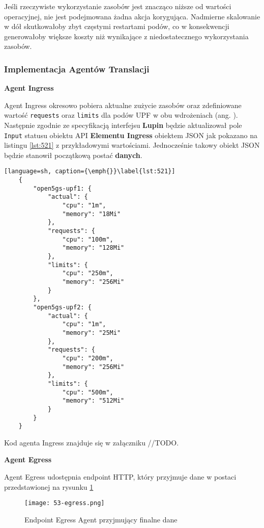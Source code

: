 Jeśli rzeczywiste wykorzystanie zasobów jest znacząco niższe od wartości operacyjnej, nie jest podejmowana żadna akcja korygująca. Nadmierne skalowanie w dół skutkowałoby zbyt częstymi restartami podów, co w konsekwencji generowałoby większe koszty niż wynikające z niedostatecznego wykorzystania zasobów.

\subsubsection{Implementacja Agentów Translacji}

\textbf{Agent Ingress}

Agent Ingress okresowo pobiera aktualne zużycie zasobów oraz zdefiniowane wartość \texttt{requests} oraz \texttt{limits} dla podów UPF w obu wdrożeniach (ang. ). Następnie zgodnie ze specyfikacją interfejsu \textbf{Lupin} będzie aktualizował pole \texttt{Input} statusu obiektu API \textbf{Elementu Ingress} obiektem JSON jak pokazano na listingu \ref{lst:521} z przykładowymi wartościami. Jednocześnie takowy obiekt JSON będzie stanowił początkową postać \textbf{danych}.

\begin{lstlisting}[language=sh, caption={\emph{}}\label{lst:521}]
    {
        "open5gs-upf1: {
            "actual": {
                "cpu": "1m",
                "memory": "18Mi"
            },
            "requests": {
                "cpu": "100m",
                "memory": "128Mi"
            },
            "limits": {
                "cpu": "250m",
                "memory": "256Mi"
            }
        },
        "open5gs-upf2: {
            "actual": {
                "cpu": "1m",
                "memory": "25Mi"
            },
            "requests": {
                "cpu": "200m",
                "memory": "256Mi"
            },
            "limits": {
                "cpu": "500m",
                "memory": "512Mi"
            }
        }
    }
\end{lstlisting}

Kod agenta Ingress znajduje się w załączniku //TODO.

\textbf{Agent Egress}

Agent Egress udostępnia endpoint HTTP, który przyjmuje dane w postaci przedstawionej na rysunku \ref{fig:53-egress}

\begin{figure}[!h]
    \centering \texttt{[image: 53-egress.png]}
    \caption{Endpoint Egress Agent przyjmujący finalne dane}\label{fig:53-egress}
\end{figure}

